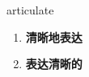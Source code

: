
\begin{frame}
{\huge articulate}
\begin{center}
\begin{enumerate}\Large
  \item \textbf{清晰地表达}
  \item \textbf{表达清晰的}
\end{enumerate}
\end{center}
\end{frame}
